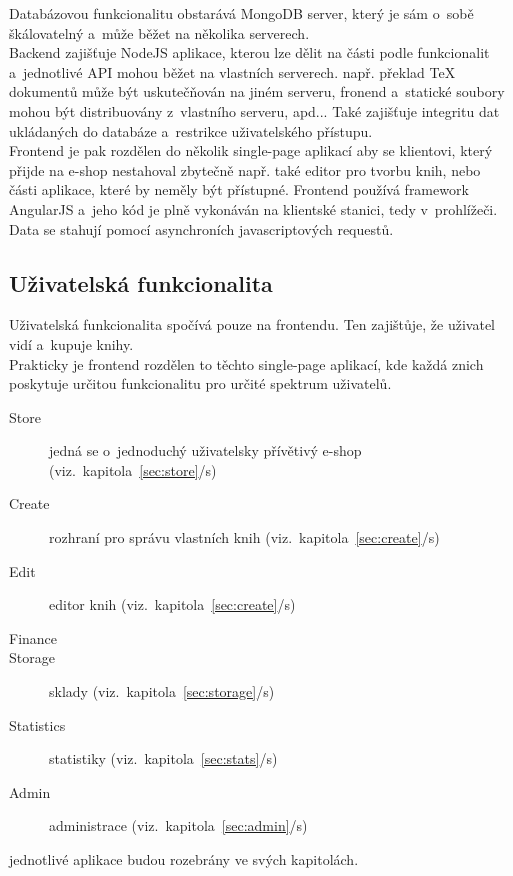 \documentclass[a4paper,12pt,twoside,BCOR=10mm]{article}
\newcommand{\odkazNaKapitolu}[1]{(viz.~kapitola~\ref{#1}/s\pageref{#1})}
\begin{document}
Databázovou funkcionalitu obstarává MongoDB server, který je sám o~sobě škálovatelný a~může běžet na několika serverech.\\

Backend zajišťuje NodeJS aplikace, kterou lze dělit na části podle funkcionalit a~jednotlivé API mohou běžet na vlastních serverech. např. překlad TeX dokumentů může být uskutečňován na jiném serveru, fronend a~statické soubory mohou být distribuovány z~vlastního serveru, apd... Také zajišťuje integritu dat ukládaných do databáze a~restrikce uživatelského přístupu.\\

Frontend je pak rozdělen do několik single-page aplikací aby se klientovi, který přijde na e-shop nestahoval zbytečně např. také editor pro tvorbu knih, nebo části aplikace, které by neměly být přístupné. Frontend používá framework AngularJS a~jeho kód je plně vykonáván na klientské stanici, tedy v~prohlížeči. Data se stahují pomocí asynchroních javascriptových requestů.\\

\subsection{Uživatelská funkcionalita}
Uživatelská funkcionalita spočívá pouze na frontendu. Ten zajištůje, že uživatel vidí a~kupuje knihy.\\

Prakticky je frontend rozdělen to těchto single-page aplikací, kde každá znich poskytuje určitou funkcionalitu pro určité spektrum uživatelů.\\

\begin{description}
 \item[Store] jedná se o~jednoduchý uživatelsky přívětivý e-shop \odkazNaKapitolu{sec:store}
 \item[Create] rozhraní pro správu vlastních knih \odkazNaKapitolu{sec:create}
 \item[Edit] editor knih \odkazNaKapitolu{sec:create}
 \item[Finance]
 \item[Storage] sklady \odkazNaKapitolu{sec:storage}
 \item[Statistics] statistiky \odkazNaKapitolu{sec:stats}
 \item[Admin] administrace \odkazNaKapitolu{sec:admin}
\end{description}

jednotlivé aplikace budou rozebrány ve svých kapitolách.
\end{document}
